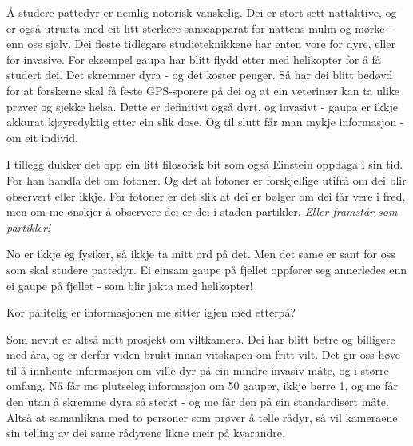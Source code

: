 
Å studere pattedyr er nemlig notorisk vanskelig. Dei er stort sett nattaktive, og er også utrusta med eit litt sterkere sanseapparat for nattens mulm og mørke - enn oss sjølv. Dei fleste tidlegare studieteknikkene har enten vore for dyre, eller for invasive. For eksempel gaupa har blitt flydd etter med helikopter for å få studert dei. Det skremmer dyra - og det koster penger. Så har dei blitt bedøvd for at forskerne skal få feste GPS-sporere på dei og at ein veterinær kan ta ulike prøver og sjekke helsa. Dette er definitivt også dyrt, og invasivt - gaupa er ikkje akkurat kjøyredyktig etter ein slik dose.
Og til slutt får man mykje informasjon - om eit individ.

I tillegg dukker det opp ein litt filosofisk bit som også Einstein oppdaga i sin tid. For han handla det om fotoner. Og det at fotoner er forskjellige utifrå om dei blir observert eller ikkje.
For fotoner er det slik at dei er bølger om dei får vere i fred, men om me ønskjer å observere dei er dei i staden partikler. \emph{Eller framstår som partikler!}

No er ikkje eg fysiker, så ikkje ta mitt ord på det. Men det same er sant for oss som skal studere pattedyr. Ei einsam gaupe på fjellet oppfører seg annerledes enn ei gaupe på fjellet - som blir jakta med helikopter!

Kor pålitelig er informasjonen me sitter igjen med etterpå?

Som nevnt er altså mitt prosjekt om viltkamera. Dei har blitt betre og billigere med åra, og er derfor viden brukt innan vitskapen om fritt vilt. Det gir oss høve til å innhente informasjon om ville dyr på ein mindre invasiv måte, og i større omfang. Nå får me plutseleg informasjon om 50 gauper, ikkje berre 1, og me får den utan å skremme dyra så sterkt - og me får den på ein standardisert måte. Altså at samanlikna med to personer som prøver å telle rådyr, så vil kameraene sin telling av dei same rådyrene likne meir på kvarandre.

